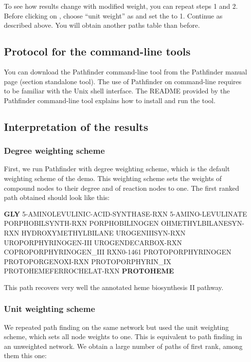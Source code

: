 To see how results change with modified weight, you can repeat steps 1 and 2. Before clicking on , choose ``unit weight'' as  and set the  to 1. Continue as described above. You will obtain another paths table than before.

\subsection{Protocol for the command-line tools}

You can download the Pathfinder command-line tool from the Pathfinder manual page (section standalone tool).
The use of Pathfinder on command-line requires to be familiar with the Unix shell interface.
The README provided by the Pathfinder command-line tool explains how to install and run the tool.

\subsection{Interpretation of the results}

\subsubsection{Degree weighting scheme}

First, we run Pathfinder with degree weighting scheme, which is the default weighting scheme of the demo. This weighting scheme sets the weights of compound nodes to their degree and of reaction nodes to one. The first ranked path obtained should look like this:

\textbf{GLY} 5-AMINOLEVULINIC-ACID-SYNTHASE-RXN  5-AMINO-LEVULINATE  PORPHOBILSYNTH-RXN PORPHOBILINOGEN OHMETHYLBILANESYN-RXN HYDROXYMETHYLBILANE UROGENIIISYN-RXN UROPORPHYRINOGEN-III UROGENDECARBOX-RXN COPROPORPHYRINOGEN\_III RXN0-1461 PROTOPORPHYRINOGEN PROTOPORGENOXI-RXN PROTOPORPHYRIN\_IX PROTOHEMEFERROCHELAT-RXN \textbf{PROTOHEME}

This path recovers very well the annotated heme biosynthesis II pathway.

\subsubsection{Unit weighting scheme}
We repeated path finding on the same network but used the unit weighting scheme, which sets all node weights to one. This is equivalent to path finding in an unweighted network. We obtain a large number of paths of first rank, among them this one:

